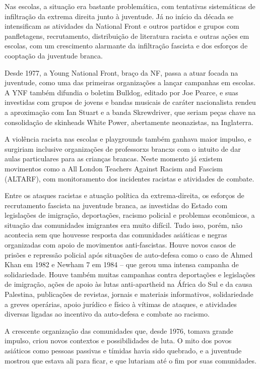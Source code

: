 Nas escolas, a situação era bastante problemática, com tentativas sistemáticas de infiltração da extrema direita junto à juventude. Já no início da década se intensificam as atividades da National Front e outros partidos e grupos com panfletagens, recrutamento, distribuição de literatura racista e outras ações em escolas, com um crescimento alarmante da infiltração fascista e dos esforços de cooptação da juventude branca.

Desde 1977, a Young National Front, braço da NF, passa a atuar focada na juventude, como uma das primeiras organizações a lançar campanhas em escolas. A YNF também difundia o boletim Bulldog, editado por Joe Pearce, e suas investidas com grupos de jovens e bandas musicais de caráter nacionalista rendeu a aproximação com Ian Stuart e a banda Skrewdriver, que seriam peças chave na consolidação de skinheads White Power, abertamente neonazistas, na Inglaterra.

A violência racista nas escolas e playgrounds também ganhava maior impulso, e surgiriam inclusive organizações de professorxs brancxs com o intuito de dar aulas particulares para as crianças brancas. Neste momento já existem movimentos como a All London Teachers Against Racism and Fascism (ALTARF), com monitoramento dos incidentes racistas e atividades de combate.

Entre os ataques racistas e atuação política da extrema-direita, os esforços de recrutamento fascista na juventude branca, as investidas do Estado com legislações de imigração, deportações, racismo policial e problemas econômicos, a situação das comunidades imigrantes era muito difícil. Tudo isso, porém, não acontecia sem que houvesse resposta das comunidades asiáticas e negras organizadas com apoio de movimentos anti-fascistas. Houve novos casos de prisões e repressão policial após situações de auto-defesa como o caso de Ahmed Khan em 1982 e Newham 7 em 1984 – que gerou uma intensa campanha de solidariedade. Houve também muitas campanhas contra deportações e legislações de imigração, ações de apoio às lutas anti-apartheid na África do Sul e da causa Palestina, publicações de revistas, jornais e materiais informativos, solidariedade a greves operárias, apoio jurídico e físico à vítimas de ataques, e atividades diversas ligadas ao incentivo da auto-defesa e combate ao racismo.

 


A crescente organização das comunidades que, desde 1976, tomava grande impulso, criou novos contextos e possibilidades de luta. O mito dos povos asiáticos como pessoas passivas e tímidas havia sido quebrado, e a juventude mostrou que estava ali para ficar, e que lutariam até o fim por suas comunidades.


